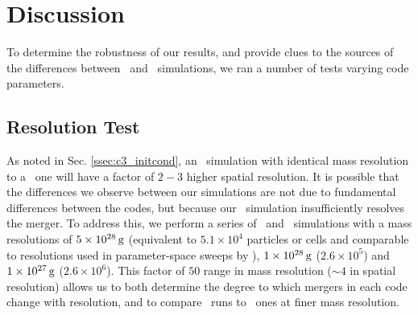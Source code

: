 \section{Discussion}
\label{sec:c3_discussion}

To determine the robustness of our results, and provide clues to the sources of the differences between \arepo\ and \gasoline\ simulations, we ran a number of tests varying code parameters.

\subsection{Resolution Test}
\label{ssec:c3_restest}


As noted in Sec. \ref{ssec:c3_initcond}, an \arepo\ simulation with identical mass resolution to a \gasoline\ one will have a factor of $2-3$ higher spatial resolution.  It is possible that the differences we observe between our simulations are not due to fundamental differences between the codes, but because our \gasoline\ simulation insufficiently resolves the merger.  To address this, we perform a series of \gasoline\ and \arepo\ simulations with a mass resolutions of $5\times10^{28}\,\mathrm{g}$ (equivalent to $5.1\times10^4$ particles or cells and comparable to resolutions used in parameter-space sweeps by \citealt{dan+12,dan+14}), $1\times10^{28}\,\mathrm{g}$ ($2.6\times10^{5}$) and $1\times10^{27}\,\mathrm{g}$ ($2.6\times10^{6}$).  This factor of $50$ range in mass resolution ($\sim4$ in spatial resolution) allows us to both determine the degree to which mergers in each code change with resolution, and to compare \arepo\ runs to \gasoline\ ones at finer mass resolution.

